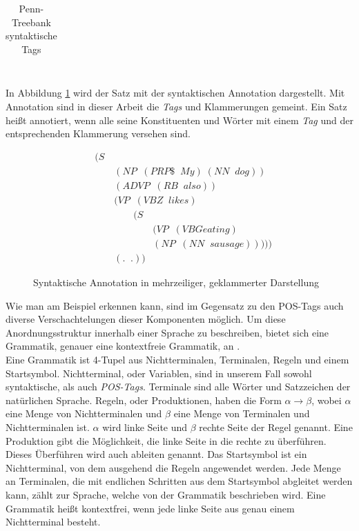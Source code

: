 \begin{table}
\begin{tabular}{ | l p{7cm} p{4cm} |}
	\hline
\end{tabular}
\caption{Penn-Treebank syntaktische Tags \cite{penntagsetAusfuehrlich}} %
\label{tab:phrase-tags}
\end{table}
\\
In Abbildung \ref{fig:multiline-annotated-dog-eating} wird der Satz mit der syntaktischen Annotation dargestellt. Mit Annotation sind in dieser Arbeit die \textit{Tags} und Klammerungen gemeint. Ein Satz heißt annotiert, wenn alle seine Konstituenten und Wörter mit einem \textit{Tag} und der entsprechenden Klammerung versehen sind.\\
\begin{figure}
\begin{align}
&(S \nonumber \\ 
& \qquad (NP \;\;(PRP\$ \;\; My)\; (NN \;\; dog)) \nonumber \\
& \qquad (ADVP \;\;(RB \;\; also)) \nonumber \\
& \qquad (VP \;\;(VBZ \;\; likes) \nonumber \\
& \qquad \qquad (S \nonumber \\
& \qquad \qquad \qquad (VP \;\;(VBG eating) \nonumber \\
& \qquad \qquad \qquad (NP \;\;(NN \;\; sausage)))))\nonumber \\
& \qquad (. \;\; .)) \nonumber
\end{align}
\label{fig:multiline-annotated-dog-eating}
\caption{Syntaktische Annotation in mehrzeiliger, geklammerter Darstellung}
\end{figure}
Wie man am Beispiel erkennen kann, sind im Gegensatz zu den POS-Tags auch diverse Verschachtelungen dieser Komponenten möglich. Um diese Anordnungsstruktur innerhalb einer Sprache zu beschreiben, bietet sich eine Grammatik, genauer eine kontextfreie Grammatik, an \cite[Kapitel 10]{nlpGrundlagen}.\\ %
Eine Grammatik ist 4-Tupel aus Nichtterminalen, Terminalen, Regeln und einem Startsymbol. Nichtterminal, oder Variablen, sind in unserem Fall sowohl syntaktische, als auch \textit{POS-Tags}. Terminale sind alle Wörter und Satzzeichen der natürlichen Sprache. Regeln, oder Produktionen, haben die Form \( \alpha \to \beta\), wobei \(\alpha\) eine Menge von Nichtterminalen und \(\beta\) eine Menge von Terminalen und Nichtterminalen ist. \(\alpha\) wird linke Seite und \(\beta\) rechte Seite der Regel genannt. Eine Produktion gibt die Möglichkeit, die linke Seite in die rechte zu überführen. Dieses Überführen wird auch ableiten genannt. Das Startsymbol ist ein Nichtterminal, von dem ausgehend die Regeln angewendet werden. Jede Menge an Terminalen, die mit endlichen Schritten aus dem Startsymbol abgleitet werden kann, zählt zur Sprache, welche von der Grammatik beschrieben wird. Eine Grammatik heißt kontextfrei, wenn jede linke Seite aus genau einem Nichtterminal besteht. \cite[Kapitel 4]{ti}\\
